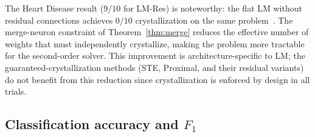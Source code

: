 \documentclass[lettersize,journal]{IEEEtran}
\begin{document}
The Heart Disease result ($9/10$ for LM-Res) is noteworthy: the flat LM
without residual connections achieves $0/10$ crystallization on the same
problem~\cite{leandro2009}.
The merge-neuron constraint of Theorem~\ref{thm:merge} reduces the effective
number of weights that must independently crystallize, making the problem more
tractable for the second-order solver.
This improvement is architecture-specific to LM; the guaranteed-crystallization
methods (STE, Proximal, and their residual variants) do not benefit from this
reduction since crystallization is enforced by design in all trials.

\subsection{Classification accuracy and \texorpdfstring{$F_1$}{F1}}
\label{ssec:accuracy}
\end{document}
